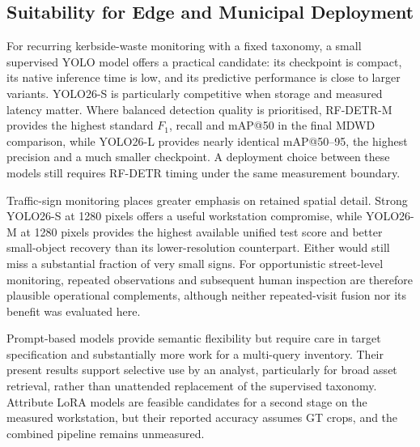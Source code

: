
\subsection{Suitability for Edge and Municipal Deployment}
\label{sec:ev-edge}
For recurring kerbside-waste monitoring with a fixed taxonomy, a small supervised YOLO model offers a practical candidate: its checkpoint is compact, its native inference time is low, and its predictive performance is close to larger variants. YOLO26-S is particularly competitive when storage and measured latency matter. Where balanced detection quality is prioritised, RF-DETR-M provides the highest standard \(F_1\), recall and \gls{mAP}@50 in the final MDWD comparison, while YOLO26-L provides nearly identical \gls{mAP}@50--95, the highest precision and a much smaller checkpoint. A deployment choice between these models still requires RF-DETR timing under the same measurement boundary.

Traffic-sign monitoring places greater emphasis on retained spatial detail. Strong YOLO26-S at 1280 pixels offers a useful workstation compromise, while YOLO26-M at 1280 pixels provides the highest available unified test score and better small-object recovery than its lower-resolution counterpart. Either would still miss a substantial fraction of very small signs. For opportunistic street-level monitoring, repeated observations and subsequent human inspection are therefore plausible operational complements, although neither repeated-visit fusion nor its benefit was evaluated here.

Prompt-based models provide semantic flexibility but require care in target specification and substantially more work for a multi-query inventory. Their present results support selective use by an analyst, particularly for broad asset retrieval, rather than unattended replacement of the supervised taxonomy. Attribute \gls{LoRA} models are feasible candidates for a second stage on the measured workstation, but their reported accuracy assumes \gls{GT} crops, and the combined pipeline remains unmeasured.

